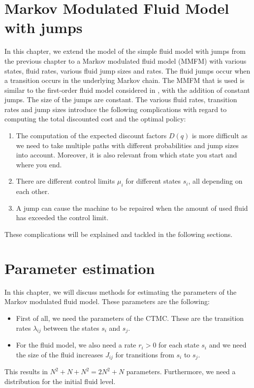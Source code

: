 \chapter{Markov Modulated Fluid Model with jumps}\label{chapter:Mmfm}
In this chapter, we extend the model of the simple fluid model with jumps from the previous chapter to a Markov modulated fluid model (MMFM) with various states, fluid rates, various fluid jump sizes and rates.
The fluid jumps occur when a transition occurs in the underlying Markov chain.
The MMFM that is used is similar to the first-order fluid model considered in \cite{Gribaudo2007}, with the addition of constant jumps.
The size of the jumps are constant.
The various fluid rates, transition rates and jump sizes introduce the following complications with regard to computing the total discounted cost and the optimal policy:
\begin{enumerate}
	\item The computation of the expected discount factors $D(q)$ is more difficult as we need to take multiple
	paths with different probabilities and jump sizes into account.
	Moreover, it is also relevant from which state you start and where you end.
	\item There are different control limits $\mu_i$ for different states $s_i$, all depending on each other.
	\item A jump can cause the machine to be repaired when the amount of used fluid has exceeded the control limit.
\end{enumerate}
These complications will be explained and tackled in the following sections.











\chapter{Parameter estimation}\label{chapter:ParameterEstimation}
In this chapter, we will discuss methods for estimating the parameters of the Markov modulated fluid model.
These parameters are the following:
\begin{itemize}
	\item First of all, we need the parameters of the CTMC.
	These are the transition rates $\lambda_{ij}$ between the states $s_i$ and $s_j$.
	\item For the fluid model, we also need a rate $r_i>0$ for each state $s_i$ and we need the size of the fluid increases $J_{ij}$ for transitions from $s_i$ to $s_j$. 
\end{itemize}
This results in $N^2+N+N^2=2N^2+N$ parameters.
Furthermore, we need a distribution for the initial fluid level.
